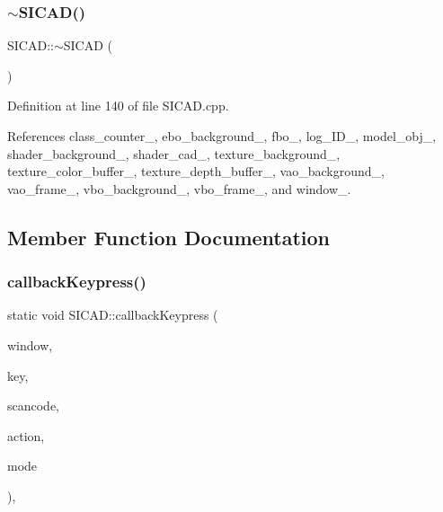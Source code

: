 \subsubsection{\texorpdfstring{$\sim$\+S\+I\+C\+A\+D()}{~SICAD()}}
{\footnotesize\ttfamily S\+I\+C\+A\+D\+::$\sim$\+S\+I\+C\+AD (\begin{DoxyParamCaption}{ }\end{DoxyParamCaption})\hspace{0.3cm}{\ttfamily [virtual]}}



Definition at line 140 of file S\+I\+C\+A\+D.\+cpp.



References class\+\_\+counter\+\_\+, ebo\+\_\+background\+\_\+, fbo\+\_\+, log\+\_\+\+I\+D\+\_\+, model\+\_\+obj\+\_\+, shader\+\_\+background\+\_\+, shader\+\_\+cad\+\_\+, texture\+\_\+background\+\_\+, texture\+\_\+color\+\_\+buffer\+\_\+, texture\+\_\+depth\+\_\+buffer\+\_\+, vao\+\_\+background\+\_\+, vao\+\_\+frame\+\_\+, vbo\+\_\+background\+\_\+, vbo\+\_\+frame\+\_\+, and window\+\_\+.



\subsection{Member Function Documentation}
\mbox{\label{classSICAD_ae2d8d44b5bbcf7329e180aafda2df386}} 
\subsubsection{\texorpdfstring{callback\+Keypress()}{callbackKeypress()}}
{\footnotesize\ttfamily static void S\+I\+C\+A\+D\+::callback\+Keypress (\begin{DoxyParamCaption}\item[{G\+L\+F\+Wwindow $\ast$}]{window,  }\item[{int}]{key,  }\item[{int}]{scancode,  }\item[{int}]{action,  }\item[{int}]{mode }\end{DoxyParamCaption})\hspace{0.3cm}{\ttfamily [static]}, {\ttfamily [private]}}

\mbox{\label{classSICAD_a2603ec5cb9a31bc7be0a335ef513ab0d}} 
